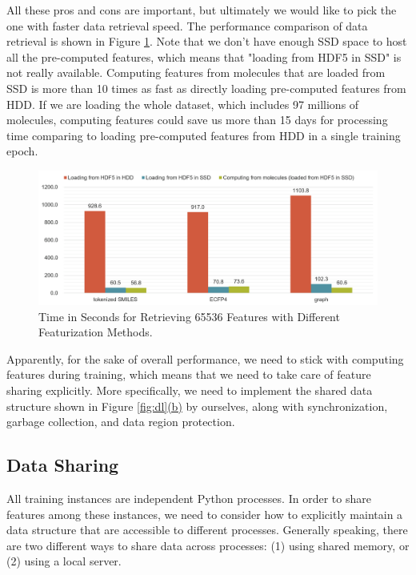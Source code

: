 \documentclass[conference]{IEEEtran}
\begin{document}
All these pros and cons are important, but ultimately we would like to pick the one with faster data retrieval speed. The performance comparison of data retrieval is shown in Figure \ref{fig:sp}. 
Note that we don't have enough SSD space to host all the pre-computed features, which means that "loading from HDF5 in SSD" is not really available. 
Computing features from molecules that are loaded from SSD is more than 10 times as fast as directly loading pre-computed features from HDD. 
If we are loading the whole dataset, which includes 97 millions of molecules, computing features could save us more than 15 days for processing time comparing to loading pre-computed features from HDD in a single training epoch. 

\begin{figure}[!htb] 
	\includegraphics[width=\linewidth]{speed.png}
	\caption{\small Time in Seconds for Retrieving 65536 Features with Different Featurization Methods. }
	\label{fig:sp}
\end{figure}

Apparently, for the sake of overall performance, we need to stick with computing features during training, which means that we need to take care of feature sharing explicitly. 
More specifically, we need to implement the shared data structure shown in Figure \ref{fig:dl}\hyperref[dl_b]{(b)} by ourselves, along with synchronization, garbage collection, and data region protection. 

\subsection{Data Sharing} \label{subsec_ds}

All training instances are independent Python processes. 
In order to share features among these instances, we need to consider how to explicitly maintain a data structure that are accessible to different processes.
Generally speaking, there are two different ways to share data across processes: (1) using shared memory, or (2) using a local server. 
\end{document}
